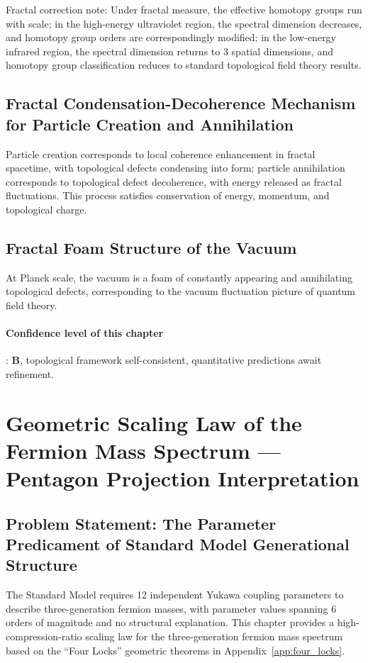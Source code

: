 \documentclass[12pt,a4paper,twocolumn]{article}
\begin{document}
Fractal correction note: Under fractal measure, the effective homotopy groups run with scale; in the high-energy ultraviolet region, the spectral dimension decreases, and homotopy group orders are correspondingly modified; in the low-energy infrared region, the spectral dimension returns to 3 spatial dimensions, and homotopy group classification reduces to standard topological field theory results.

\subsection{Fractal Condensation-Decoherence Mechanism for Particle Creation and Annihilation}
Particle creation corresponds to local coherence enhancement in fractal spacetime, with topological defects condensing into form; particle annihilation corresponds to topological defect decoherence, with energy released as fractal fluctuations. This process satisfies conservation of energy, momentum, and topological charge.

\subsection{Fractal Foam Structure of the Vacuum}
At Planck scale, the vacuum is a foam of constantly appearing and annihilating topological defects, corresponding to the vacuum fluctuation picture of quantum field theory.

\paragraph{Confidence level of this chapter}: \textbf{B}, topological framework self-consistent, quantitative predictions await refinement.

\section{Geometric Scaling Law of the Fermion Mass Spectrum --- Pentagon Projection Interpretation}
\label{sec:fermion_mass}

\subsection{Problem Statement: The Parameter Predicament of Standard Model Generational Structure}
The Standard Model requires 12 independent Yukawa coupling parameters to describe three-generation fermion masses, with parameter values spanning 6 orders of magnitude and no structural explanation. This chapter provides a high-compression-ratio scaling law for the three-generation fermion mass spectrum based on the ``Four Locks'' geometric theorems in Appendix~\ref{app:four_locks}.
\end{document}
